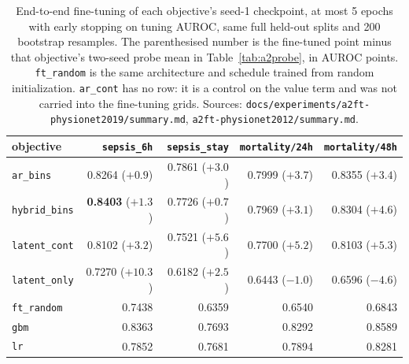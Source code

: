 \documentclass[11pt,a4paper]{article}
\newcommand{\code}[1]{\texttt{\small #1}}
\newcommand{\best}[1]{\textbf{#1}}
\begin{document}
\begin{table}[h]
\centering\small
\caption{End-to-end fine-tuning of each objective's seed-1 checkpoint, at most
5 epochs with early stopping on tuning AUROC, same full held-out splits and
200 bootstrap resamples. The parenthesised number is the fine-tuned point
minus that objective's two-seed probe mean in Table~\ref{tab:a2probe}, in
AUROC points. \code{ft\_random} is the same architecture and schedule trained
from random initialization. \code{ar\_cont} has no row: it is a control on the
value term and was not carried into the fine-tuning grids. Sources:
\code{docs/experiments/a2ft-physionet2019/summary.md},
\code{a2ft-physionet2012/summary.md}.}
\label{tab:a2ft}
\begin{tabular}{lrrrr}
\toprule
objective & \code{sepsis\_6h} & \code{sepsis\_stay} & \code{mortality/24h} & \code{mortality/48h} \\
\midrule
\code{ar\_bins} & 0.8264 ($+0.9$) & 0.7861 ($+3.0$) & 0.7999 ($+3.7$) & 0.8355 ($+3.4$) \\
\code{hybrid\_bins} & \best{0.8403} ($+1.3$) & 0.7726 ($+0.7$) & 0.7969 ($+3.1$) & 0.8304 ($+4.6$) \\
\code{latent\_cont} & 0.8102 ($+3.2$) & 0.7521 ($+5.6$) & 0.7700 ($+5.2$) & 0.8103 ($+5.3$) \\
\code{latent\_only} & 0.7270 ($+10.3$) & 0.6182 ($+2.5$) & 0.6443 ($-1.0$) & 0.6596 ($-4.6$) \\
\midrule
\code{ft\_random} & 0.7438 & 0.6359 & 0.6540 & 0.6843 \\
\code{gbm} & 0.8363 & 0.7693 & 0.8292 & 0.8589 \\
\code{lr} & 0.7852 & 0.7681 & 0.7894 & 0.8281 \\
\bottomrule
\end{tabular}
\end{table}
\end{document}
